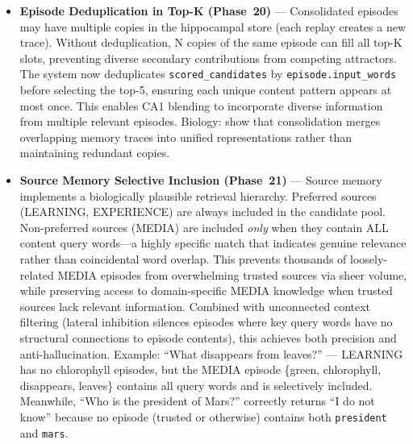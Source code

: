\documentclass[11pt]{article}
\begin{document}
\begin{itemize}
      Biology: hippocampal time cells \citep{eichenbaum2014time} encode temporal context;
      PFC top-down modulation biases retrieval toward temporally-tagged episodes.
\item \textbf{Episode Deduplication in Top-K (Phase~20)} --- Consolidated episodes may have
      multiple copies in the hippocampal store (each replay creates a new trace). Without
      deduplication, N copies of the same episode can fill all top-K slots, preventing
      diverse secondary contributions from competing attractors. The system now deduplicates
      \texttt{scored\_candidates} by \texttt{episode.input\_words} before selecting the top-5,
      ensuring each unique content pattern appears at most once. This enables CA1 blending
      to incorporate diverse information from multiple relevant episodes.
      Biology: \citet{born2012system} show that consolidation merges overlapping memory traces
      into unified representations rather than maintaining redundant copies.
\item \textbf{Source Memory Selective Inclusion (Phase~21)} --- Source memory implements a
      biologically plausible retrieval hierarchy. Preferred sources (LEARNING, EXPERIENCE)
      are always included in the candidate pool. Non-preferred sources (MEDIA) are included
      \emph{only} when they contain ALL content query words---a highly specific match that
      indicates genuine relevance rather than coincidental word overlap. This prevents thousands
      of loosely-related MEDIA episodes from overwhelming trusted sources via sheer volume,
      while preserving access to domain-specific MEDIA knowledge when trusted sources lack
      relevant information. Combined with unconnected context filtering (lateral inhibition
      silences episodes where key query words have no structural connections to episode contents),
      this achieves both precision and anti-hallucination.
      Example: ``What disappears from leaves?'' --- LEARNING has no chlorophyll episodes, but
      the MEDIA episode \{green, chlorophyll, disappears, leaves\} contains all query words
      and is selectively included. Meanwhile, ``Who is the president of Mars?'' correctly
      returns ``I do not know'' because no episode (trusted or otherwise) contains both
      \texttt{president} and \texttt{mars}.
\end{itemize}
\end{document}
